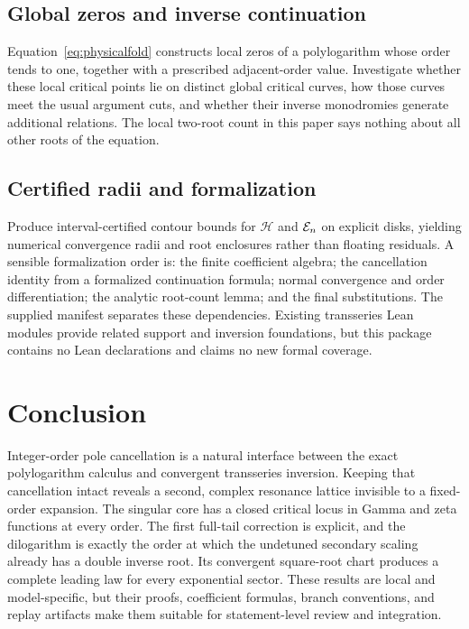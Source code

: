 \documentclass[11pt,a4paper]{article}
\numberwithin{equation}{section}
\theoremstyle{definition}\newtheorem{definition}[theorem]{Definition}
\theoremstyle{remark}\newtheorem{remark}[theorem]{Remark}
\newcommand{\HH}{\mathcal H}
\begin{document}
\subsection{Global zeros and inverse continuation}
Equation~\eqref{eq:physicalfold} constructs local zeros of a polylogarithm
whose order tends to one, together with a prescribed adjacent-order
value. Investigate whether these local critical points lie on distinct
global critical curves, how those curves meet the usual argument cuts,
and whether their inverse monodromies generate additional relations.
The local two-root count in this paper says nothing about all other roots
of the equation.

\subsection{Certified radii and formalization}
Produce interval-certified contour bounds for $\HH$ and $\mathcal E_n$ on
explicit disks, yielding numerical convergence radii and root enclosures
rather than floating residuals. A sensible formalization order is: the
finite coefficient algebra; the cancellation identity from a formalized
continuation formula; normal convergence and order differentiation; the
analytic root-count lemma; and the final substitutions. The supplied
manifest separates these dependencies. Existing transseries Lean modules
provide related support and inversion foundations, but this package
contains no Lean declarations and claims no new formal coverage.

\section{Conclusion}
Integer-order pole cancellation is a natural interface between the exact
polylogarithm calculus and convergent transseries inversion. Keeping that
cancellation intact reveals a second, complex resonance lattice invisible
to a fixed-order expansion. The singular core has a closed critical locus
in Gamma and zeta functions at every order. The first full-tail correction
is explicit, and the dilogarithm is exactly the order at which the
undetuned secondary scaling already has a double inverse root. Its
convergent square-root chart produces a complete leading law for every
exponential sector. These results are local and model-specific, but their
proofs, coefficient formulas, branch conventions, and replay artifacts
make them suitable for statement-level review and integration.
\end{document}
